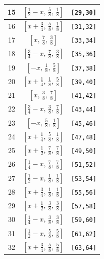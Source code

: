 \documentclass[fleqn,8pt]{jsarticle}
\begin{document}
\begin{longtable}{ccc}
15 & $\left[ \frac{1}{2} - x,\, \frac{5}{8},\, \frac{1}{8} \right]$ & {\tt [29,30]} \\ \hline
16 & $\left[ x + \frac{3}{4},\, \frac{5}{8},\, \frac{1}{8} \right]$ & {\tt [31,32]} \\ \hline
17 & $\left[ x,\, \frac{7}{8},\, \frac{3}{8} \right]$ & {\tt [33,34]} \\ \hline
18 & $\left[ \frac{3}{4} - x,\, \frac{7}{8},\, \frac{3}{8} \right]$ & {\tt [35,36]} \\ \hline
19 & $\left[ - x,\, \frac{1}{8},\, \frac{5}{8} \right]$ & {\tt [37,38]} \\ \hline
20 & $\left[ x + \frac{1}{4},\, \frac{1}{8},\, \frac{5}{8} \right]$ & {\tt [39,40]} \\ \hline
21 & $\left[ x,\, \frac{3}{8},\, \frac{7}{8} \right]$ & {\tt [41,42]} \\ \hline
22 & $\left[ \frac{3}{4} - x,\, \frac{3}{8},\, \frac{7}{8} \right]$ & {\tt [43,44]} \\ \hline
23 & $\left[ - x,\, \frac{5}{8},\, \frac{1}{8} \right]$ & {\tt [45,46]} \\ \hline
24 & $\left[ x + \frac{1}{4},\, \frac{5}{8},\, \frac{1}{8} \right]$ & {\tt [47,48]} \\ \hline
25 & $\left[ x + \frac{1}{2},\, \frac{7}{8},\, \frac{7}{8} \right]$ & {\tt [49,50]} \\ \hline
26 & $\left[ \frac{1}{4} - x,\, \frac{7}{8},\, \frac{7}{8} \right]$ & {\tt [51,52]} \\ \hline
27 & $\left[ \frac{1}{2} - x,\, \frac{1}{8},\, \frac{1}{8} \right]$ & {\tt [53,54]} \\ \hline
28 & $\left[ x + \frac{3}{4},\, \frac{1}{8},\, \frac{1}{8} \right]$ & {\tt [55,56]} \\ \hline
29 & $\left[ x + \frac{1}{2},\, \frac{3}{8},\, \frac{3}{8} \right]$ & {\tt [57,58]} \\ \hline
30 & $\left[ \frac{1}{4} - x,\, \frac{3}{8},\, \frac{3}{8} \right]$ & {\tt [59,60]} \\ \hline
31 & $\left[ \frac{1}{2} - x,\, \frac{5}{8},\, \frac{5}{8} \right]$ & {\tt [61,62]} \\ \hline
32 & $\left[ x + \frac{3}{4},\, \frac{5}{8},\, \frac{5}{8} \right]$ & {\tt [63,64]} \\
\end{longtable}
\renewcommand{\arraystretch}{1.2}
\end{document}
